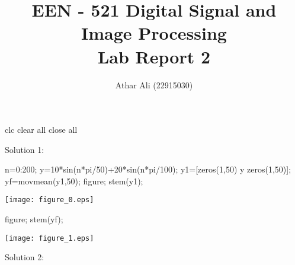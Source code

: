 \documentclass[12pt, onecolumn]{IEEEtran}
\begin{document}
	\author{Athar Ali (22915030)}
	\title{\bf{ \large EEN - 521 Digital Signal and Image Processing\\ Lab Report 2}}
	\maketitle 
	 {}
	
	
	
	\vspace{1em}

\begin{matlabcode}
clc
clear all
close all
\end{matlabcode}

\begin{par}
\begin{flushleft}
Solution 1:
\end{flushleft}
\end{par}

\begin{matlabcode}
n=0:200;
y=10*sin(n*pi/50)+20*sin(n*pi/100);
y1=[zeros(1,50) y zeros(1,50)];
yf=movmean(y1,50);
figure; 
stem(y1);
\end{matlabcode}
\begin{center}
\texttt{[image: figure\_0.eps]}
\end{center}
\begin{matlabcode}
figure; 
stem(yf);
\end{matlabcode}
\begin{center}
\texttt{[image: figure\_1.eps]}
\end{center}

\begin{par}
\begin{flushleft}
Solution 2:
\end{flushleft}
\end{par}
\end{document}
